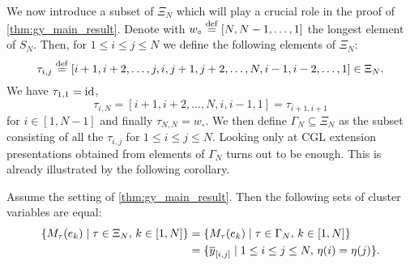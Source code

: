 We now introduce a subset of $\Xi_N$ which will play a crucial role in the proof of
\cref{thm:gy_main_result}. Denote with $w_\circ \overset{\mathrm{def}}{=} [N, N-1, \dots, 1]$ the longest element of $S_N$. Then, for $1 \leq i \leq j \leq N$ we
define the following elements of $\Xi_N$:
\begin{equation*}
	\tau_{i,j} \overset{\mathrm{def}}{=} [i+1, i+2, \dots, j, i ,j+1, j+2, \dots, N, i-1,i-2, \dots, 1] \in \Xi_N.
\end{equation*}
%
We have $\tau_{1,1} = \operatorname{id}$,
\begin{equation*}
	\tau_{i, N} = [i+1, i+2, \dots, N, i, i-1, 1] = \tau_{i+1, i+1}
\end{equation*}
%
for $i \in [1, N-1]$ and finally $\tau_{N, N} = w_\circ$. We then define $\Gamma_N
	\subseteq \Xi_N$ as the subset consisting of all the
$\tau_{i,j}$ for $1 \leq i \leq j \leq N$. Looking only at CGL extension presentations
obtained from elements of $\Gamma_N$ turns out to be enough. This is already
illustrated by the following corollary.
\begin{corollary}\label{cor:cluster_variables}

	Assume the setting of \cref{thm:gy_main_result}. Then the following sets of cluster
	variables are equal:
	\begin{align*}
		\{M_\tau(e_k) \mid \tau \in \Xi_N,\, k \in [1, N]\}
		 & = \{M_\tau(e_k) \mid \tau \in \Gamma_N,\, k \in [1, N]\}             \\
		 & = \{\overline{y}_{[i,j]} \mid 1 \leq i \leq j \leq N, \, \eta(i) = \eta(j)\}.
	\end{align*}
\end{corollary}
